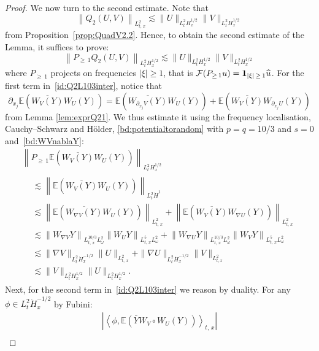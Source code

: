 \documentclass[10pt]{amsart}
\theoremstyle{definition}\newtheorem{defi}[theo]{Definition}\newtheorem{rema}[theo]{Remark}\newtheorem{exam}[theo]{Example}\newtheorem{exem}[theo]{Example}\newtheorem{nota}[theo]{Notation}
\newcommand{\E}{\mathbb{E}}
\newcommand{\mclF}{\mathcal{F}}
\newcommand{\bfun}{\mathbf{1}}
\let\oldhat\hat
\renewcommand*{\hat}[1]{\mathchoice{\widehat{#1}}{\widehat{#1}}{\oldhat{#1}}{\oldhat{#1}}}
\begin{document}
\begin{proof}
We now turn to the second estimate. Note that
\[
\left\|Q_2(U,V)\right\|_{L^{2}_{t,\,x}} \lesssim \|U\|_{L^2_{t}H^{1/2}_x} \|V\|_{L^2_{t}H^{1/2}_x}
\]
from Proposition~\ref{prop:QuadV2.2}. Hence, to obtain the second estimate of the Lemma, it suffices to prove:
\begin{equation} \label{bd:intermediateQ2highreg}
\left\|P_{\geq\,1}Q_2(U,V)\right\|_{L^{2}_{t}H^{1/2}_x} \lesssim \|U\|_{L^2_{t}H^{1/2}_x} \|V\|_{L^2_{t}H^{1/2}_x}
\end{equation}
where $P_{\geq\,1}$ projects on frequencies $|\xi|\geq1$, that is $\mclF(P_{\geq\,1}u)=\bfun_{|\xi|\,\geq \,1}\hat u$. For the first term in~\eqref{id:Q2L103inter}, notice that
\[
\partial_{x_j}\E \left(\overline{W_V(Y)}W_U(Y)\right)=\E \left(\overline{W_{\partial_{x_j}V}(Y)}W_{U}(Y)\right)+\E \left(\overline{W_{V}(Y)}W_{\partial_{x_j}U}(Y)\right)
\]
from Lemma \eqref{lem:exprQ21}. We thus estimate it using the frequency localisation, Cauchy--Schwarz and H\"older, \eqref{bd:potentialtorandom} with $p=q=10/3$ and $s=0$ and~\eqref{bd:WVnablaY}:
\begin{multline}\label{bd:WVWUinter2}
\left\| P_{\geq\,1}\E \left(\overline{W_{V}(Y)}W_U(Y)\right)\right\|_{L^2_t H^{1/2}_x}\\
\begin{aligned}
&\lesssim \left\| \E \left(\overline{W_{V}(Y)}W_U(Y)\right)\right\|_{L^2_t \dot H^{1}}\\
&\lesssim \left\| \E \left(\overline{W_{\nabla V}(Y)}W_U(Y)\right)\right\|_{L^2_{t,\,x}}+\left\| \E \left(\overline{W_{V}(Y)}W_{\nabla U}(Y)\right)\right\|_{L^2_{t,\,x}}\\
&\lesssim \left\| W_{\nabla V} Y \right\|_{L^{10/3}_{t,\,x}L^2_\omega }\left\| W_{U} Y \right\|_{L^{5}_{t,\,x}L^2_\omega }+\left\| W_{\nabla U} Y \right\|_{L^{10/3}_{t,\,x}L^2_\omega }\left\| W_{V} Y \right\|_{L^{5}_{t,\,x}L^2_\omega } \\
&\lesssim \| \nabla V \|_{L^2_t\dot H^{-1/2}_x }\| U \|_{L^2_{t,\,x}}+ \| \nabla U \|_{L^2_t\dot H^{-1/2}_x }\| V \|_{L^2_{t,x}}\\
&\lesssim \| V \|_{L^2_tH^{1/2}_x}\| U \|_{L^2_{t}H^{1/2}_x}.
\end{aligned}
\end{multline}
Next, for the second term in~\eqref{id:Q2L103inter} we reason by duality. For any $\phi \in L^2_t\dot H^{-1/2}_x$ by Fubini:
\begin{multline*}
\left|\left\langle \phi, \E\left(\bar Y W_V\circ W_U(Y)\right)\right\rangle_{t,\,x}\right|\\

\end{multline*}
\end{proof}
\end{document}
